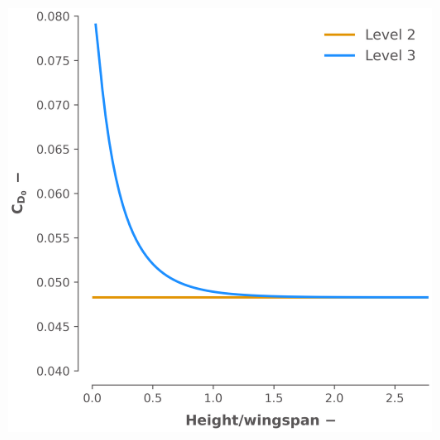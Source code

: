 \begin{figure}[!ht]
    \centering
    \begin{minipage}{.48\textwidth}
      \centering
      \includegraphics[width=\linewidth]{figures/CD2_CD3.png}
      \label{fig:drag_level2_3}
    \end{minipage}%
    \hfill
    \begin{minipage}{.48\textwidth}
      \centering

\end{minipage}
\end{figure}
